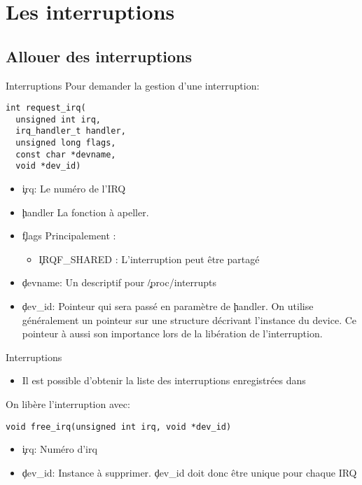 \section{Les interruptions}

\subsection{Allouer des interruptions}

\begin{frame}[fragile=singleslide]{Interruptions}
  Pour demander la gestion d'une interruption:
  \begin{lstlisting}  
int request_irq(
  unsigned int irq, 
  irq_handler_t handler, 
  unsigned long flags, 
  const char *devname, 
  void *dev_id)
  \end{lstlisting} 
  \begin{itemize} 
  \item \c{irq}: Le numéro de l'IRQ
  \item \c{handler} La fonction à apeller.
  \item \c{flags} Principalement : 
    \begin{itemize} 
    \item \c{IRQF_SHARED} : L'interruption peut être partagé
    \end{itemize} 
  \item \c{devname}: Un descriptif pour \c{/proc/interrupts}
  \item  \c{dev_id}:   Pointeur  qui   sera  passé  en   paramètre  de
    \c{handler}. On utilise généralement un pointeur sur une structure
    décrivant l'instance du device. Ce pointeur à aussi son importance
    lors de la libération de l'interruption.
  \end{itemize}
\end{frame}

\begin{frame}[fragile=singleslide]{Interruptions}
  \begin{itemize} 
  \item  Il   est  possible  d'obtenir  la   liste  des  interruptions
    enregistrées dans 
  \end{itemize} 
  On libère l'interruption avec:
  \begin{lstlisting} 
void free_irq(unsigned int irq, void *dev_id)
  \end{lstlisting} 
  \begin{itemize} 
  \item \c{irq}: Numéro d'irq
  \item \c{dev_id}:  Instance à  supprimer. \c{dev_id} doit  donc être
    unique pour chaque IRQ
  \end{itemize}
\end{frame}

